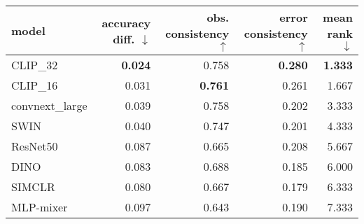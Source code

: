 \begin{tabular}{lrrrr}
\toprule
          model & accuracy diff. $\downarrow$ & obs. consistency $\uparrow$ & error consistency $\uparrow$ & mean rank $\downarrow$ \\
\midrule
       CLIP\_32 &              \textbf{0.024} &                       0.758 &               \textbf{0.280} &         \textbf{1.333} \\
       CLIP\_16 &                       0.031 &              \textbf{0.761} &                        0.261 &                  1.667 \\
convnext\_large &                       0.039 &                       0.758 &                        0.202 &                  3.333 \\
           SWIN &                       0.040 &                       0.747 &                        0.201 &                  4.333 \\
       ResNet50 &                       0.087 &                       0.665 &                        0.208 &                  5.667 \\
           DINO &                       0.083 &                       0.688 &                        0.185 &                  6.000 \\
         SIMCLR &                       0.080 &                       0.667 &                        0.179 &                  6.333 \\
      MLP-mixer &                       0.097 &                       0.643 &                        0.190 &                  7.333 \\
\bottomrule
\end{tabular}


